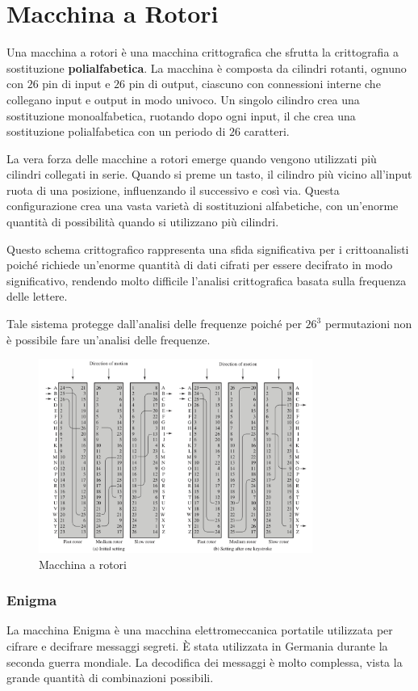 \section{Macchina a Rotori}
Una macchina a rotori è una macchina crittografica che sfrutta
la crittografia a sostituzione \textbf{polialfabetica}. La macchina è composta
da cilindri rotanti, ognuno con $26$ pin di input e $26$ pin di output,
ciascuno con connessioni interne che collegano input e output in modo
univoco. Un singolo cilindro crea una sostituzione monoalfabetica,
ruotando dopo ogni input, il che crea una sostituzione polialfabetica
con un periodo di $26$ caratteri.

La vera forza delle macchine a rotori emerge quando vengono utilizzati
più cilindri collegati in serie. Quando si preme un tasto, il cilindro
più vicino all'input ruota di una posizione, influenzando il successivo
e così via. Questa configurazione crea una vasta varietà di sostituzioni
alfabetiche, con un'enorme quantità di possibilità quando si utilizzano
più cilindri.

Questo schema crittografico rappresenta una sfida significativa per i
crittoanalisti poiché richiede un'enorme quantità di dati cifrati per
essere decifrato in modo significativo, rendendo molto difficile
l'analisi crittografica basata sulla frequenza delle lettere.

Tale sistema protegge dall'analisi delle frequenze poiché per $26^3$ permutazioni 
non è possibile fare un'analisi delle frequenze.
\begin{figure}[H]
    \centering
    \includegraphics[width=0.8\textwidth]{img/Concatenazione_crittosistemi.png}
    \caption{Macchina a rotori}
\end{figure}

\subsubsection{Enigma}
La macchina Enigma è una macchina elettromeccanica portatile utilizzata per cifrare e decifrare
messaggi segreti. È stata utilizzata in Germania durante la seconda guerra mondiale.
La decodifica dei messaggi è molto complessa, vista la grande quantità di combinazioni possibili.

